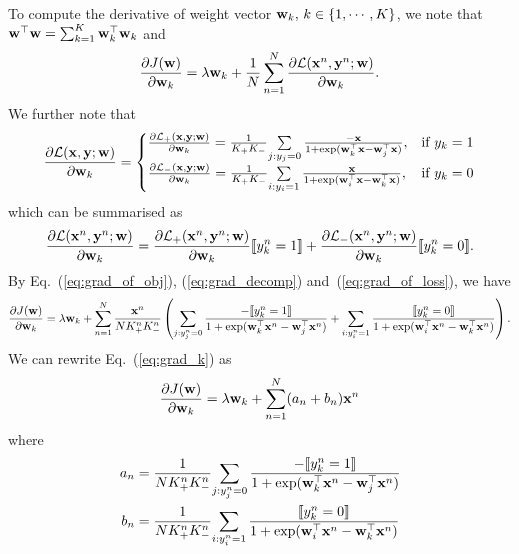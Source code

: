 To compute the derivative of weight vector $\mathbf{w}_k, \, k \in \{1,\cdots,K\}$, we note that $\mathbf{w}^\top \mathbf{w} = \sum_{k=1}^K \mathbf{w}_k^\top \mathbf{w}_k$ and 
\begin{equation}
\label{eq:grad_of_obj}
\frac{\partial J(\mathbf{w})} {\partial \mathbf{w}_k} = \lambda \mathbf{w}_k + \frac{1}{N} \sum_{n=1}^N \frac{\partial \mathcal{L}(\mathbf{x}^n, \mathbf{y}^n; \mathbf{w})} {\partial \mathbf{w}_k}.
\end{equation}
We further note that 
\begin{equation}
\label{eq:grad_decomp}
\frac{\partial \mathcal{L}(\mathbf{x}, \mathbf{y}; \mathbf{w})} {\partial \mathbf{w}_k} =
\begin{cases}
\frac{\partial \mathcal{L}_+(\mathbf{x}, \mathbf{y}; \mathbf{w})} {\partial \mathbf{w}_k} = \frac{1}{K_+ K_-} \underset{j:y_j=0}{\sum} \, \frac{-\mathbf{x}} {1 + \exp(\mathbf{w}_k^\top \mathbf{x} - \mathbf{w}_j^\top \mathbf{x})}, 
    & \text{if} \ y_k=1 \\
\frac{\partial \mathcal{L}_-(\mathbf{x}, \mathbf{y}; \mathbf{w})} {\partial \mathbf{w}_k} = \frac{1}{K_+ K_-} \underset{i:y_i=1}{\sum} \, \frac{\mathbf{x}} {1 + \exp(\mathbf{w}_i^\top \mathbf{x} - \mathbf{w}_k^\top \mathbf{x})},
    & \text{if} \ y_k=0
\end{cases}
\end{equation}
which can be summarised as
\begin{equation}
\label{eq:grad_of_loss}
\frac{\partial \mathcal{L}(\mathbf{x}^n, \mathbf{y}^n; \mathbf{w})} {\partial \mathbf{w}_k} =
\frac{\partial \mathcal{L}_+(\mathbf{x}^n, \mathbf{y}^n; \mathbf{w})} {\partial \mathbf{w}_k} \llbracket y_k^n=1 \rrbracket +
\frac{\partial \mathcal{L}_-(\mathbf{x}^n, \mathbf{y}^n; \mathbf{w})} {\partial \mathbf{w}_k} \llbracket y_k^n=0 \rrbracket.
\end{equation}
%
By Eq.~(\ref{eq:grad_of_obj}), (\ref{eq:grad_decomp}) and~(\ref{eq:grad_of_loss}), we have
\begin{equation}
\label{eq:grad_k}
\frac{\partial J(\mathbf{w})} {\partial \mathbf{w}_k} = \lambda \mathbf{w}_k + \sum_{n=1}^N \frac{\mathbf{x}^n}{N K_+^n K_-^n} \left(
\underset{j:y_j^n=0}{\sum} \, \frac{-\llbracket y_k^n=1 \rrbracket} {1 + \exp(\mathbf{w}_k^\top \mathbf{x}^n - \mathbf{w}_j^\top \mathbf{x}^n)} +
\underset{i:y_i^n=1}{\sum} \, \frac{ \llbracket y_k^n=0 \rrbracket} {1 + \exp(\mathbf{w}_i^\top \mathbf{x}^n - \mathbf{w}_k^\top \mathbf{x}^n)} \right).
\end{equation}
%
We can rewrite Eq.~(\ref{eq:grad_k}) as
$$
\frac{\partial J(\mathbf{w})} {\partial \mathbf{w}_k} = \lambda \mathbf{w}_k + \sum_{n=1}^N (a_n + b_n) \mathbf{x}^n
$$
where
\begin{align*}
a_n &= \frac{1}{N K_+^n K_-^n} \underset{j:y_j^n=0}{\sum} \, \frac{-\llbracket y_k^n=1 \rrbracket} {1 + \exp(\mathbf{w}_k^\top \mathbf{x}^n - \mathbf{w}_j^\top \mathbf{x}^n)} \\
b_n &= \frac{1}{N K_+^n K_-^n} \underset{i:y_i^n=1}{\sum} \, \frac{ \llbracket y_k^n=0 \rrbracket} {1 + \exp(\mathbf{w}_i^\top \mathbf{x}^n - \mathbf{w}_k^\top \mathbf{x}^n)}
\end{align*}



